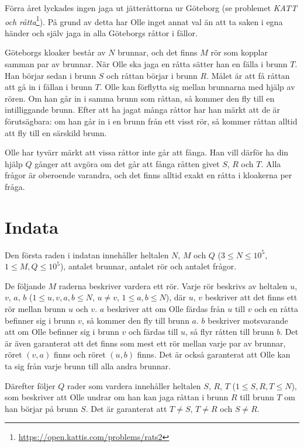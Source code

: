 
\noindent
Förra året lyckades ingen jaga ut jätteråttorna ur Göteborg (se problemet
\textit{KATT och råtta}\footnote{\url{https://open.kattis.com/problems/rats2}}).
På grund av detta har Olle inget annat val än att ta saken i egna händer och själv jaga in alla Göteborgs
råttor i fällor.

Göteborgs kloaker består av $N$ brunnar, och det finns $M$ rör som kopplar samman par av brunnar. 
När Olle ska jaga en råtta sätter han en fälla i brunn $T$. Han börjar sedan i brunn $S$ och råttan börjar
i brunn $R$. Målet är att få råttan att gå in i fällan i brunn $T$. Olle kan förflytta sig mellan brunnarna
med hjälp av rören. Om han går in i samma brunn som råttan, så kommer den fly till en intilliggande brunn.
Efter att ha jagat många råttor har han märkt att de är förutsägbara: om han går in i en brunn från ett
visst rör, så kommer råttan alltid att fly till en särskild brunn.

Olle har tyvärr märkt att vissa råttor inte går att fånga. Han vill därför ha din hjälp $Q$ gånger att avgöra
om det går att fånga råtten givet $S$, $R$ och $T$. Alla frågor är oberoende varandra, och det finns alltid
exakt en råtta i kloakerna per fråga.


\section*{Indata}
Den första raden i indatan innehåller heltalen $N$, $M$ och $Q$ ($3 \leq N \leq 10^5$, $1 \le M,Q \le 10^5$),
antalet brunnar, antalet rör och antalet frågor.

De följande $M$ raderna beskriver vardera ett rör. Varje rör beskrivs av heltalen $u$, $v$, $a$, $b$ 
($1 \leq u,v,a,b \leq N$, $u \neq v$, $1 \leq a,b \leq N$), där $u$, $v$ beskriver att det finns ett rör mellan
brunn $u$ och $v$.
$a$ beskriver att om Olle färdas från $u$ till $v$ och en råtta befinner sig i brunn $v$, så kommer 
den fly till brunn $a$. $b$ beskriver motsvarande att om Olle befinner sig i brunn $v$ och färdas
till $u$, så flyr råtten till brunn $b$. Det är även garanterat att det finns som mest ett rör
mellan varje par av brunnar, röret $(v,a)$ finns och röret $(u,b)$ finns. Det är också garanterat
att Olle kan ta sig från varje brunn till alla andra brunnar.

Därefter följer $Q$ rader som vardera innehåller heltalen $S$, $R$, $T$ ($1 \leq S,R,T \leq N$),
som beskriver att Olle undrar om han kan jaga råttan i brunn $R$ till brunn $T$ om han börjar på
brunn $S$. Det är garanterat att $T \neq S$, $T \neq R$ och $S \neq R$.

